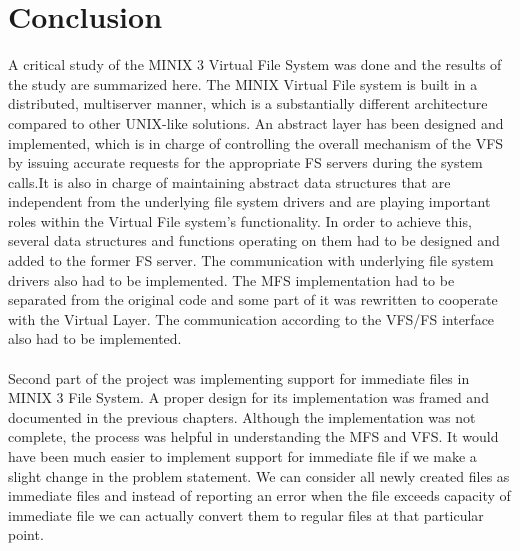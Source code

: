\chapter{Conclusion}

A critical study of the MINIX 3 Virtual File System was done and the results of the study are summarized here. The MINIX Virtual File system is built in a distributed, multiserver manner, which is a substantially different architecture compared to other UNIX-like solutions. An abstract layer has been designed and implemented, which is in charge of controlling the overall mechanism of the VFS by issuing accurate requests for the appropriate FS servers during the system calls.It is also in charge of maintaining abstract data structures that are independent from the underlying file system drivers and are playing important roles within the Virtual File system’s functionality. In order to achieve this, several data structures and functions operating on them had to be designed and added to the former FS server. The communication with underlying file system drivers also had to be implemented. The MFS implementation had to be separated from the original code and some part of it was rewritten to cooperate with the Virtual Layer. The communication according to the VFS/FS interface also had to be implemented.\\
\\
Second part of the project was implementing support for immediate files in MINIX 3 File System. A proper design for its implementation was framed and documented in the previous chapters. Although the implementation was not complete, the process was helpful in understanding the MFS and VFS. It would have been much easier to implement support for immediate file if we make a slight change in the problem statement. We can consider all newly created files as immediate files and instead of reporting an error when the file exceeds capacity of immediate file we can actually convert them to regular files at that particular point.  

